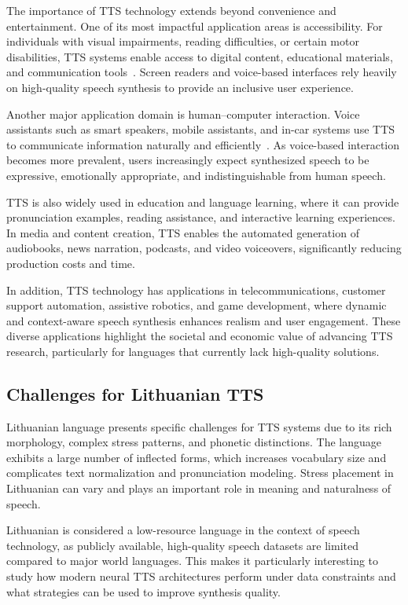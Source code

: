 \documentclass[
         english, %
    monochrome, %
]{VUMIFSEMasterThesis}
\begin{document}
The importance of TTS technology extends beyond convenience and entertainment. One of its most impactful application areas is accessibility. For individuals with visual impairments, reading difficulties, or certain motor disabilities, TTS systems enable access to digital content, educational materials, and communication tools~\cite{chalamandaris2010unit, reddy2023speech}. Screen readers and voice-based interfaces rely heavily on high-quality speech synthesis to provide an inclusive user experience.

Another major application domain is human–computer interaction. Voice assistants such as smart speakers, mobile assistants, and in-car systems use TTS to communicate information naturally and efficiently~\cite{mohasi2006text}. As voice-based interaction becomes more prevalent, users increasingly expect synthesized speech to be expressive, emotionally appropriate, and indistinguishable from human speech.

TTS is also widely used in education and language learning, where it can provide pronunciation examples, reading assistance, and interactive learning experiences. In media and content creation, TTS enables the automated generation of audiobooks, news narration, podcasts, and video voiceovers, significantly reducing production costs and time.

In addition, TTS technology has applications in telecommunications, customer support automation, assistive robotics, and game development, where dynamic and context-aware speech synthesis enhances realism and user engagement. These diverse applications highlight the societal and economic value of advancing TTS research, particularly for languages that currently lack high-quality solutions.

\subsection*{Challenges for Lithuanian TTS}

Lithuanian language presents specific challenges for TTS systems due to its rich morphology, complex stress patterns, and phonetic distinctions. The language exhibits a large number of inflected forms, which increases vocabulary size and complicates text normalization and pronunciation modeling. Stress placement in Lithuanian can vary and plays an important role in meaning and naturalness of speech.

Lithuanian is considered a low-resource language in the context of speech technology, as publicly available, high-quality speech datasets are limited compared to major world languages. This makes it particularly interesting to study how modern neural TTS architectures perform under data constraints and what strategies can be used to improve synthesis quality.
\end{document}
